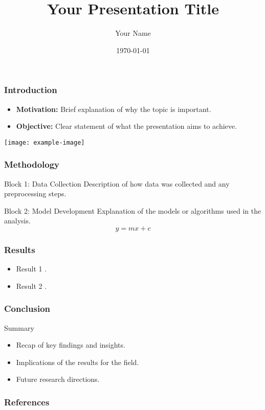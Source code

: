 \documentclass{beamer}
\title{Your Presentation Title}
\author{Your Name}
\date{\today}
\institute{Your Institution}
\begin{document}
\begin{frame}[plain]
  \titlepage
\end{frame}

\begin{frame}
  \frametitle{Introduction}
  \begin{itemize}
    \item \textbf{Motivation:} Brief explanation of why the topic is important.
    \item \textbf{Objective:} Clear statement of what the presentation aims to achieve.
  \end{itemize}
  
  \begin{center}
    \texttt{[image: example-image]}
  \end{center}
\end{frame}

\begin{frame}
  \frametitle{Methodology}
  \begin{block}{Block 1: Data Collection}
    Description of how data was collected and any preprocessing steps.
  \end{block}
  
  \begin{block}{Block 2: Model Development}
    Explanation of the models or algorithms used in the analysis.
    \begin{equation}
      y = mx + c
    \end{equation}
  \end{block}
\end{frame}

\begin{frame}
  \frametitle{Results}
  \lipsum[2]

  \begin{itemize}
    \item Result 1 \cite{author1_year1}.
    \item Result 2 \cite{author2_year2}.
  \end{itemize}
\end{frame}

\begin{frame}
  \frametitle{Conclusion}
  \begin{block}{Summary}
    \begin{itemize}
      \item Recap of key findings and insights.
      \item Implications of the results for the field.
      \item Future research directions.
    \end{itemize}
  \end{block}
\end{frame}

\begin{frame}
  \frametitle{References}
  
  
\end{frame}
\end{document}
